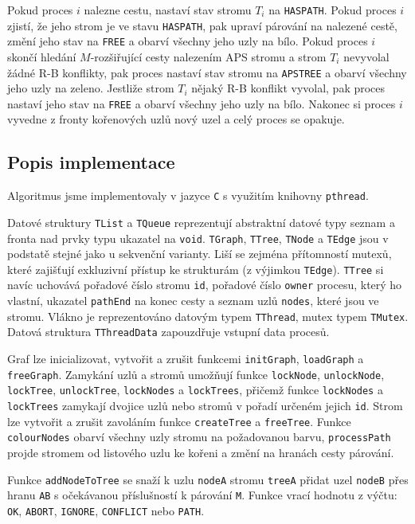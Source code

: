 \documentclass[a4paper, 11pt, titlepage, final]{article}[3. prosinec 2011]
\begin{document}
Pokud proces $i$ nalezne cestu, nastaví stav stromu $T_i$ na \texttt{HASPATH}. Pokud proces $i$ zjistí, že jeho strom je ve stavu \texttt{HASPATH}, pak upraví párování na nalezené cestě, změní jeho stav na \texttt{FREE} a obarví všechny jeho uzly na bílo. Pokud proces $i$ skončí hledání $M$-rozšiřující cesty nalezením APS stromu a strom $T_i$ nevyvolal žádné R-B konflikty, pak proces nastaví stav stromu na \texttt{APSTREE} a obarví všechny jeho uzly na zeleno. Jestliže strom $T_i$ nějaký R-B konflikt vyvolal, pak proces nastaví jeho stav na \texttt{FREE} a obarví všechny jeho uzly na bílo. Nakonec si proces $i$ vyvedne z fronty kořenových uzlů nový uzel a celý proces se opakuje.

\subsection{Popis implementace}

Algoritmus jsme implementovaly v jazyce \texttt{C} s využitím knihovny \texttt{pthread}. 

Datové struktury \texttt{TList} a \texttt{TQueue} reprezentují abstraktní datové typy seznam a fronta nad prvky typu ukazatel na \texttt{void}. \texttt{TGraph}, \texttt{TTree}, \texttt{TNode} a \texttt{TEdge} jsou v podstatě stejné jako u sekvenční varianty. Liší se zejména přítomností mutexů, které zajišťují exkluzivní přístup ke strukturám (z výjimkou \texttt{TEdge}). \texttt{TTree} si navíc uchovává pořadové číslo stromu \texttt{id}, pořadové číslo \texttt{owner} procesu, který ho vlastní, ukazatel \texttt{pathEnd} na konec cesty a seznam uzlů \texttt{nodes}, které jsou ve stromu. Vlákno je reprezentováno datovým typem \texttt{TThread}, mutex typem \texttt{TMutex}. Datová struktura \texttt{TThreadData} zapouzdřuje vstupní data procesů.

Graf lze inicializovat, vytvořit a zrušit funkcemi \texttt{initGraph}, \texttt{loadGraph} a \texttt{freeGraph}. Zamykání uzlů a stromů umožňují funkce \texttt{lockNode}, \texttt{unlockNode}, \texttt{lockTree}, \texttt{unlockTree}, \texttt{lockNodes} a \texttt{lockTrees}, přičemž funkce \texttt{lockNodes} a \texttt{lockTrees} zamykají dvojice uzlů nebo stromů v pořadí určeném jejich \texttt{id}. Strom lze vytvořit a zrušit zavoláním funkce \texttt{createTree} a \texttt{freeTree}. Funkce \texttt{colourNodes} obarví všechny uzly stromu na požadovanou barvu, \texttt{processPath} projde stromem od listového uzlu ke kořeni a změní na hranách cesty párování.

Funkce \texttt{addNodeToTree} se snaží k uzlu \texttt{nodeA} stromu \texttt{treeA} přidat uzel \texttt{nodeB} přes hranu \texttt{AB} s očekávanou příslušností k párování \texttt{M}. Funkce vrací hodnotu z výčtu: \texttt{OK}, \texttt{ABORT}, \texttt{IGNORE}, \texttt{CONFLICT} nebo \texttt{PATH}. 
\end{document}
